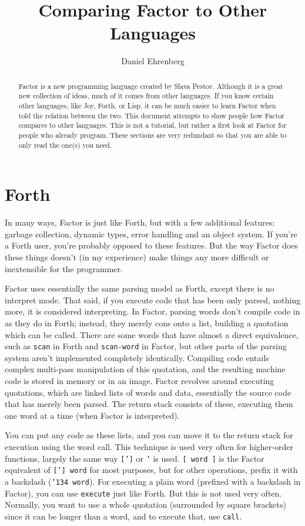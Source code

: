 \documentclass{article}
\author{Daniel Ehrenberg}
\title{Comparing Factor to Other Languages}
\begin{document}
\maketitle

\begin{abstract}
Factor is a new programming language created by Slava Pestov. Although it is a great new collection of ideas, much of it comes from other languages. If you know certain other languages, like Joy, Forth, or Lisp, it can be much easier to learn Factor when told the relation between the two. This document attempts to show people how Factor compares to other languages. This is not a tutorial, but rather a first look at Factor for people who already program. These sections are very redundant so that you are able to only read the one(s) you need.
\end{abstract}

\section{Forth}

In many ways, Factor is just like Forth, but with a few additional features: garbage collection, dynamic types, error handling and an object system. If you're a Forth user, you're probably opposed to these features. But the way Factor does these things doesn't (in my experience) make things any more difficult or inextensible for the programmer.

Factor uses essentially the same parsing model as Forth, except there is no interpret mode. That said, if you execute code that has been only parsed, nothing more, it is considered interpreting. In Factor, parsing words don't compile code in as they do in Forth; instead, they merely cons onto a list, building a quotation which can be called. There are some words that have almost a direct equivalence, such as \texttt{scan} in Forth and \texttt{scan-word} in Factor, but other parts of the parsing system aren't implemented completely identically. Compiling code entails complex multi-pass manipulation of this quotation, and the resulting machine code is stored in memory or in an image. Factor revolves around executing quotations, which are linked lists of words and data, essentially the source code that has merely been parsed. The return stack consists of these, executing them one word at a time (when Factor is interpreted).

You can put any code as these lists, and you can move it to the return stack for execution using the word call. This technique is used very often for higher-order functions, largely the same way \texttt{[']} or \texttt{'} is used. \texttt{[ word ]} is the Factor equivalent of \texttt{['] word} for most purposes, but for other operations, prefix it with a backslash (\texttt{\char'134 word}). For executing  a plain word (prefixed with a backslash in Factor), you can use \texttt{execute} just like Forth. But this is not used very often. Normally, you want to use a whole quotation (surrounded by square brackets) since it can be longer than a word, and to execute that, use \texttt{call}.
\end{document}
